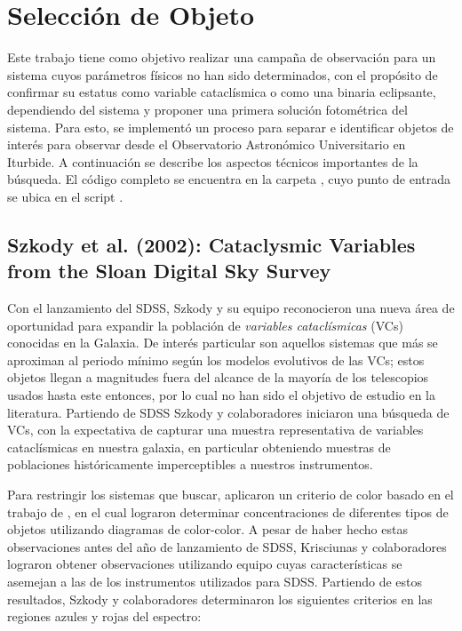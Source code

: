 \chapter{Selección de Objeto}

Este trabajo tiene como objetivo realizar una campaña de observación para un
sistema cuyos parámetros físicos no han sido determinados, con el propósito de
confirmar su estatus como variable cataclísmica o como una binaria eclipsante,
dependiendo del sistema y proponer una primera solución fotométrica del sistema.
Para esto, se implementó un proceso para separar e identificar objetos de
interés para observar desde el Observatorio Astronómico Universitario en
Iturbide. A continuación se describe los aspectos técnicos importantes de la
búsqueda. El código completo se encuentra en la carpeta
\href{https://github.com/KnightIV/UANL_MAPTA_Observaciones/tree/main/obsrv_plan}{},
cuyo punto de entrada se ubica en el script
\href{URLhttps://github.com/KnightIV/UANL_MAPTA_Observaciones/blob/main/obsrv_plan/main.py}{}.

\section{Szkody et al. (2002): Cataclysmic Variables from the Sloan Digital Sky Survey} \label{muestra:szkody2002}

Con el lanzamiento del SDSS, Szkody y su equipo reconocieron una nueva área de
oportunidad para expandir la población de \textit{variables cataclísmicas} (VCs)
conocidas en la Galaxia. De interés particular son aquellos sistemas que más se
aproximan al periodo mínimo según los modelos evolutivos de las VCs; estos
objetos llegan a magnitudes fuera del alcance de la mayoría de los telescopios
usados hasta este entonces, por lo cual no han sido el objetivo de estudio en la
literatura. Partiendo de SDSS Szkody y colaboradores iniciaron una búsqueda de
VCs, con la expectativa de capturar una muestra representativa de
variables cataclísmicas en nuestra galaxia, en particular obteniendo muestras de
poblaciones históricamente imperceptibles a nuestros instrumentos.

Para restringir los sistemas que buscar, 
aplicaron un criterio de color basado en el trabajo de
, en el cual lograron determinar
concentraciones de diferentes tipos de objetos utilizando diagramas de
color-color. A pesar de haber hecho estas observaciones antes del año de
lanzamiento de SDSS, Krisciunas y colaboradores lograron obtener observaciones
utilizando equipo cuyas características se asemejan a las de los instrumentos
utilizados para SDSS. Partiendo de estos resultados, Szkody y colaboradores
determinaron los siguientes criterios en las regiones azules y rojas del
espectro:


